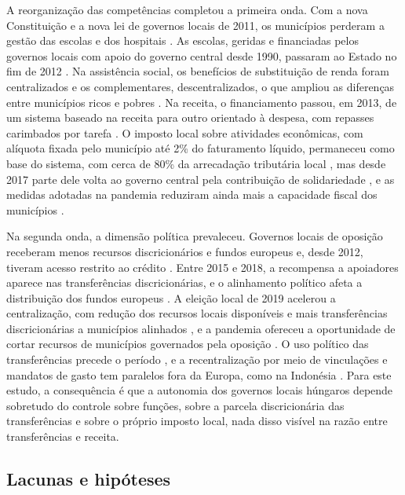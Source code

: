 A reorganização das competências completou a primeira onda. Com a nova Constituição e a nova lei de governos locais de 2011, os municípios perderam a gestão das escolas e dos hospitais \citep{Bado2023, Kecso2020}. As escolas, geridas e financiadas pelos governos locais com apoio do governo central desde 1990, passaram ao Estado no fim de 2012 \citep{Semjen2023, Semjen2018}. Na assistência social, os benefícios de substituição de renda foram centralizados e os complementares, descentralizados, o que ampliou as diferenças entre municípios ricos e pobres \citep{Hoffman2019535}. Na receita, o financiamento passou, em 2013, de um sistema baseado na receita para outro orientado à despesa, com repasses carimbados por tarefa \citep{OCDE_UCLG2016}. O imposto local sobre atividades econômicas, com alíquota fixada pelo município até 2\% do faturamento líquido, permaneceu como base do sistema, com cerca de 80\% da arrecadação tributária local \citep{Kecso2020}, mas desde 2017 parte dele volta ao governo central pela contribuição de solidariedade \citep{CoE2024}, e as medidas adotadas na pandemia reduziram ainda mais a capacidade fiscal dos municípios \citep{Pal2024129}.

Na segunda onda, a dimensão política prevaleceu. Governos locais de oposição receberam menos recursos discricionários e fundos europeus e, desde 2012, tiveram acesso restrito ao crédito \citep{Vasvari2022150}. Entre 2015 e 2018, a recompensa a apoiadores aparece nas transferências discricionárias, e o alinhamento político afeta a distribuição dos fundos europeus \citep{Vasvari20241371}. A eleição local de 2019 acelerou a centralização, com redução dos recursos locais disponíveis e mais transferências discricionárias a municípios alinhados \citep{Vasvari2024467}, e a pandemia ofereceu a oportunidade de cortar recursos de municípios governados pela oposição \citep{Kovarek2023}. O uso político das transferências precede o período \citep{Gregor2020}, e a recentralização por meio de vinculações e mandatos de gasto tem paralelos fora da Europa, como na Indonésia \citep{Lewis20231}. Para este estudo, a consequência é que a autonomia dos governos locais húngaros depende sobretudo do controle sobre funções, sobre a parcela discricionária das transferências e sobre o próprio imposto local, nada disso visível na razão entre transferências e receita.

\subsection{Lacunas e hipóteses}\label{sec:hipoteses}

